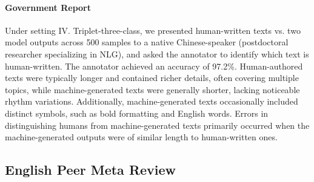 \paragraph{Government Report}
Under setting IV. Triplet-three-class, we presented human-written texts vs. two model outputs across 500 samples to a native Chinese-speaker (postdoctoral researcher specializing in NLG), and asked the annotator to identify which text is human-written. 
The annotator achieved an accuracy of 97.2\%. Human-authored texts were typically longer and contained richer details, often covering multiple topics, while machine-generated texts were generally shorter, lacking noticeable rhythm variations. Additionally, machine-generated texts occasionally included distinct symbols, such as bold formatting and English words.
Errors in distinguishing humans from machine-generated texts primarily occurred when the machine-generated outputs were of similar length to human-written ones. 


\subsection{English Peer Meta Review}




